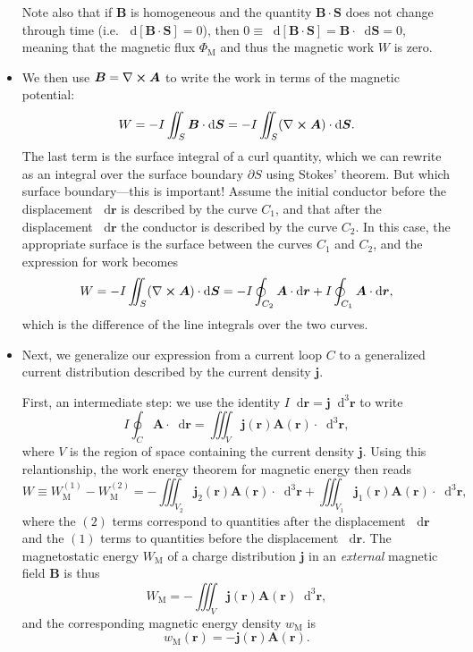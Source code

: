 \documentclass[11pt, a4paper]{article}
\newcommand{\diff}{\mathop{}\!\mathrm{d}} %
\newcommand{\dr}{\diff^{3} \r}  %
\renewcommand{\vec}[1]{\bm{#1}} %
\renewcommand{\r}{\vec{r}}
\newcommand{\B}{\vec{B}} %
\newcommand{\A}{\vec{A}} %
\renewcommand{\j}{\vec{j}}  %
\renewcommand{\curl}{\nabla \cross}
\begin{document}
\begin{itemize}
    Note also that if $ \B $ is homogeneous and the quantity $ \B \cdot \vec{S} $ does not change through time (i.e. $ \diff [\B \cdot \vec{S}] = 0 $), then $ 0 \equiv \diff [\B \cdot \vec{S}] = \B \cdot \diff \vec{S} = 0 $, meaning that the magnetic flux $ \Phi_{\text{M}} $ and thus the magnetic work $ W $ is zero.
	
    \item We then use $ \B = \curl \A $ to write the work in terms of the magnetic potential:
	\begin{equation*}
		W = - I \iint_{S}\B \cdot \diff \vec{S} = - I \iint_{S} (\curl \A) \cdot \diff \vec{S}.
	\end{equation*}
	The last term is the surface integral of a curl quantity, which we can rewrite as an integral over the surface boundary $ \partial S $ using Stokes' theorem. But which surface boundary---this is important! Assume the initial conductor before the displacement $ \diff \r $ is described by the curve $ C_{1} $, and that after the displacement $ \diff \r $ the conductor is described by the curve $ C_{2} $. In this case, the appropriate surface is the surface between the curves $ C_{1} $ and $ C_{2} $, and the expression for work becomes
	\begin{equation*}
        W = - I \iint_{S} (\curl \A) \cdot \diff \vec{S} = - I \oint_{C_{2}} \A \cdot \diff \r  + I \oint_{C_{1}} \A \cdot \diff \r,
	\end{equation*}
	which is the difference of the line integrals over the two curves.
	
	\item Next, we generalize our expression from a current loop $ C $ to a generalized current distribution described by the current density $ \j $. 

    First, an intermediate step: we use the identity $ I \diff \r = \j \dr $ to write
	\begin{equation*}
		I \oint_{C} \A \cdot \diff \r = \iiint_{V} \j(\r)\A(\r) \cdot \dr,
	\end{equation*}
	where $ V $ is the region of space containing the current density $ \j $. Using this relantionship, the work energy theorem for magnetic energy then reads
	\begin{equation*}
		W \equiv W_{\text{M}}^{(1)} - W_{\text{M}}^{(2)} = - \iiint_{V_{2}} \j_{2}(\r) \A(\r) \cdot \dr + \iiint_{V_{1}} \j_{1}(\r) \A(\r) \cdot \dr,
	\end{equation*}
    where the $ (2) $ terms correspond to quantities after the displacement $ \diff \r $ and the $ (1) $ terms to quantities before the displacement $ \diff \r $. The magnetostatic energy $ W_{\text{M}} $ of a charge distribution $ \j $ in an \textit{external} magnetic field $ \B $ is thus
	\begin{equation*}
		W_{\text{M}} = - \iiint_{V}\j(\r) \A(\r) \dr,
	\end{equation*}
	and the corresponding magnetic energy density $ w_{\text{M}} $ is
	\begin{equation*}
		w_{\text{M}}(\r) = - \j(\r) \A (\r).
	\end{equation*}
	
\end{itemize}
\end{document}
